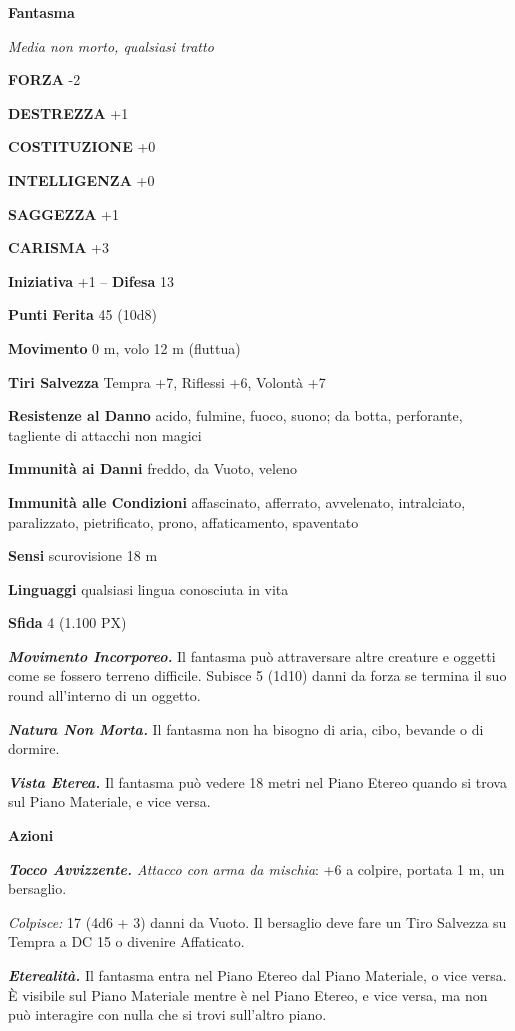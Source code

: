 \begin{multicols}{2}
\medskip{}\textbf{Fantasma}

\textit{Media non morto, qualsiasi tratto}

\textbf{FORZA} -2

\textbf{DESTREZZA} +1

\textbf{COSTITUZIONE} +0

\textbf{INTELLIGENZA} +0

\textbf{SAGGEZZA} +1

\textbf{CARISMA} +3

\textbf{Iniziativa} +1 -- \textbf{Difesa} 13

\textbf{Punti Ferita} 45 (10d8)

\textbf{Movimento} 0 m, volo 12 m (fluttua)

\textbf{Tiri Salvezza} Tempra +7, Riflessi +6, Volontà +7

\textbf{Resistenze al Danno} acido, fulmine, fuoco, suono; da botta, perforante, tagliente di attacchi non magici

\textbf{Immunità ai Danni} freddo, da Vuoto, veleno

\textbf{Immunità alle Condizioni} affascinato, afferrato, avvelenato, intralciato, paralizzato, pietrificato, prono, affaticamento, spaventato

\textbf{Sensi} scurovisione 18 m

\textbf{Linguaggi} qualsiasi lingua conosciuta in vita

\textbf{Sfida} 4 (1.100 PX)

\textit{\textbf{Movimento Incorporeo.}} Il fantasma può attraversare altre creature e oggetti come se fossero terreno difficile. Subisce 5 (1d10) danni da forza se termina il suo round all'interno di un oggetto.

\textit{\textbf{Natura Non Morta.}} Il fantasma non ha bisogno di aria, cibo, bevande o di dormire.

\textit{\textbf{Vista Eterea.}} Il fantasma può vedere 18 metri nel Piano Etereo quando si trova sul Piano Materiale, e vice versa.

\textbf{Azioni}

\textit{\textbf{Tocco Avvizzente.} Attacco con arma da mischia}: +6 a colpire, portata 1 m, un bersaglio.

\textit{Colpisce:} 17 (4d6 + 3) danni da Vuoto. Il bersaglio deve fare un Tiro Salvezza su Tempra a DC 15 o divenire Affaticato.

\textit{\textbf{Eterealità.}} Il fantasma entra nel Piano Etereo dal Piano Materiale, o vice versa. È visibile sul Piano Materiale mentre è nel Piano Etereo, e vice versa, ma non può interagire con nulla che si trovi sull'altro piano.


\end{multicols}
